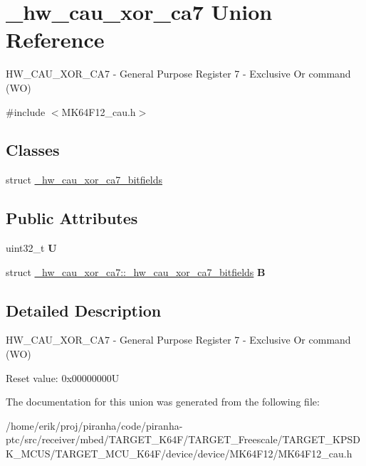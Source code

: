 \hypertarget{union__hw__cau__xor__ca7}{}\section{\+\_\+hw\+\_\+cau\+\_\+xor\+\_\+ca7 Union Reference}
\label{union__hw__cau__xor__ca7}


H\+W\+\_\+\+C\+A\+U\+\_\+\+X\+O\+R\+\_\+\+C\+A7 -\/ General Purpose Register 7 -\/ Exclusive Or command (WO)  




{\ttfamily \#include $<$M\+K64\+F12\+\_\+cau.\+h$>$}

\subsection*{Classes}
\begin{DoxyCompactItemize}
\item 
struct \hyperlink{struct__hw__cau__xor__ca7_1_1__hw__cau__xor__ca7__bitfields}{\+\_\+hw\+\_\+cau\+\_\+xor\+\_\+ca7\+\_\+bitfields}
\end{DoxyCompactItemize}
\subsection*{Public Attributes}
\begin{DoxyCompactItemize}
\item 
uint32\+\_\+t {\bfseries U}\hypertarget{union__hw__cau__xor__ca7_ac8ed8631d2504dfc26656abe5c2c60e3}{}\label{union__hw__cau__xor__ca7_ac8ed8631d2504dfc26656abe5c2c60e3}

\item 
struct \hyperlink{struct__hw__cau__xor__ca7_1_1__hw__cau__xor__ca7__bitfields}{\+\_\+hw\+\_\+cau\+\_\+xor\+\_\+ca7\+::\+\_\+hw\+\_\+cau\+\_\+xor\+\_\+ca7\+\_\+bitfields} {\bfseries B}\hypertarget{union__hw__cau__xor__ca7_af201c0092fd3e469172b9665bc55d244}{}\label{union__hw__cau__xor__ca7_af201c0092fd3e469172b9665bc55d244}

\end{DoxyCompactItemize}


\subsection{Detailed Description}
H\+W\+\_\+\+C\+A\+U\+\_\+\+X\+O\+R\+\_\+\+C\+A7 -\/ General Purpose Register 7 -\/ Exclusive Or command (WO) 

Reset value\+: 0x00000000U 

The documentation for this union was generated from the following file\+:\begin{DoxyCompactItemize}
\item 
/home/erik/proj/piranha/code/piranha-\/ptc/src/receiver/mbed/\+T\+A\+R\+G\+E\+T\+\_\+\+K64\+F/\+T\+A\+R\+G\+E\+T\+\_\+\+Freescale/\+T\+A\+R\+G\+E\+T\+\_\+\+K\+P\+S\+D\+K\+\_\+\+M\+C\+U\+S/\+T\+A\+R\+G\+E\+T\+\_\+\+M\+C\+U\+\_\+\+K64\+F/device/device/\+M\+K64\+F12/M\+K64\+F12\+\_\+cau.\+h\end{DoxyCompactItemize}
